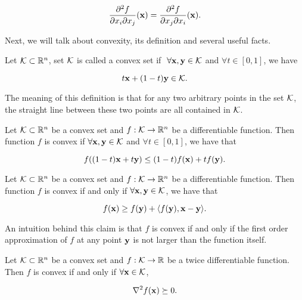 \documentclass[main.tex]{subfiles}
\begin{document}
\begin{equation*}
	\frac{\partial ^2 f}{\partial x_i \partial x_j} (\mathbf{x}) = \frac{\partial ^2 f}{\partial x_j \partial x_i} (\mathbf{x}).
\end{equation*}

Next, we will talk about convexity, its definition and several useful facts.

\begin{definition}
	Let $\mathcal{K} \subset \mathbb{R}^n$, set $\mathcal{K}$ is called a convex set if  $\ \forall \mathbf{x},\mathbf{y} \in \mathcal{K}$ and $\forall t \in [0,1]$, we have
	
	\begin{equation}
		t\mathbf{x} + (1-t)\mathbf{y} \in \mathcal{K}.
	\end{equation}
	
	The meaning of this definition is that for any two arbitrary points in the set $\mathcal{K}$, the straight line between these two points are all contained in $\mathcal{K}$.
\end{definition}

\begin{definition}
	Let $\mathcal{K} \subset \mathbb{R}^n$ be a convex set and $f: \mathcal{K} \to \mathbb{R}^n$ be a differentiable function. Then function $f$ is convex if $\forall \mathbf{x},\mathbf{y} \in \mathcal{K}$ and $\forall t\in [0, 1]$, we have that
	
	\begin{equation}
	f((1-t)\mathbf{x} + t \mathbf{y}) \leq (1-t) f(\mathbf{x})+ t f(\mathbf{y}). \label{convex_f_1}
	\end{equation}
\end{definition}


\begin{claim}
	Let $\mathcal{K} \subset \mathbb{R}^n$ be a convex set and $f: \mathcal{K} \to \mathbb{R}^n$ be a differentiable function. Then function $f$ is convex if and only if $\forall \mathbf{x},\mathbf{y} \in \mathcal{K}$, we have that
	
	\begin{equation}
		f(\mathbf{x}) \geq f(\mathbf{y}) + \langle f(\mathbf{y}) , \mathbf{x} - \mathbf{y} \rangle. \label{convex_f_2}
	\end{equation}
\end{claim}

An intuition behind this claim is that $f$ is convex if and only if the first order approximation of $f$ at any point $\mathbf{y}$ is not larger than the function itself.
\begin{claim}
	Let $\mathcal{K} \subset \mathbb{R}^n$ be a convex set and $f: \mathcal{K} \to \mathbb{R}$ be a twice differentiable function. Then $f$ is convex if and only if  $\forall \mathbf{x} \in \mathcal{K}$, 
	
	\begin{equation}
		\nabla^2 f(\mathbf{x}) \succeq 0. \label{convex_f_3}
	\end{equation}
\end{claim}
\end{document}
